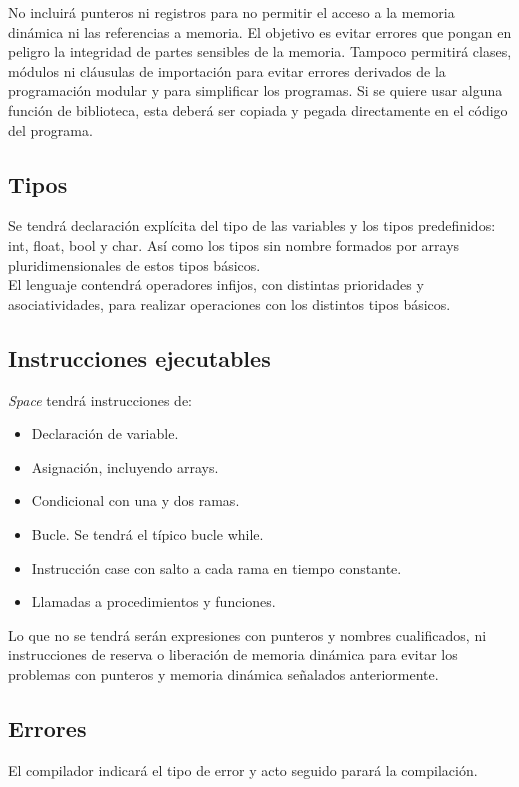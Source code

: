 \documentclass[a4paper, 12pt]{article}
\begin{document}
No incluirá punteros ni registros para no permitir el acceso a la memoria dinámica ni las referencias a memoria. El objetivo es evitar errores que pongan en peligro la integridad de partes sensibles de la memoria. Tampoco permitirá clases, módulos ni cláusulas de importación para evitar errores derivados de la programación modular y para simplificar los programas. Si se quiere usar alguna función de biblioteca, esta deberá ser copiada y pegada directamente en el código del programa.

\subsection{Tipos}
Se tendrá declaración explícita del tipo de las variables y los tipos predefinidos: int, float, bool y char. Así como los tipos sin nombre formados por arrays pluridimensionales de estos tipos básicos.\\

El lenguaje contendrá operadores infijos, con distintas prioridades y asociatividades, para realizar operaciones con los distintos tipos básicos.

\subsection{Instrucciones ejecutables}
\textit{Space} tendrá instrucciones de:
\begin{itemize}
\item Declaración de variable.
\item Asignación, incluyendo arrays.
\item Condicional con una y dos ramas.
\item Bucle. Se tendrá el típico bucle while.
\item Instrucción case con salto a cada rama en tiempo constante.
\item Llamadas a procedimientos y funciones.
\end{itemize}
Lo que no se tendrá serán expresiones con punteros y nombres cualificados, ni instrucciones de reserva o liberación de memoria dinámica para evitar los problemas con punteros y memoria dinámica señalados anteriormente.

\subsection{Errores}
El compilador indicará el tipo de error y acto seguido parará la compilación.
\newpage
\end{document}
